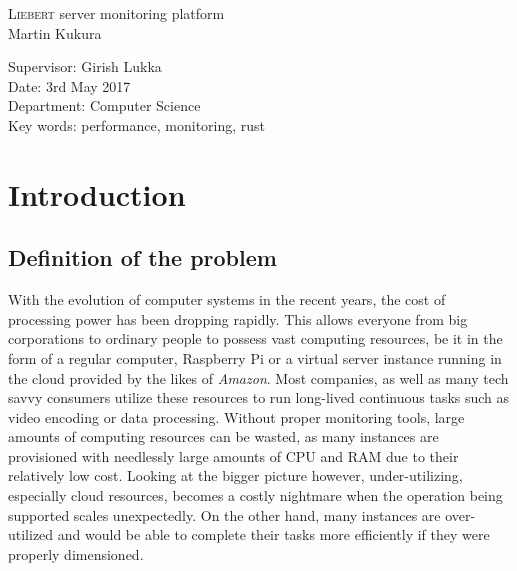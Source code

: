 \documentclass[12pt,a4paper,table]{article}
\begin{document}
    \begin{titlepage}
        \vspace*{1.5cm}
        \begin{center}
            \Huge{\textsc{Liebert} server monitoring platform}\\
            \Large{Martin Kukura}\\
        \end{center}
        \vspace*{\fill}
        \begin{center}
            \Large{Supervisor: Girish Lukka}\\
            \Large{Date: 3rd May 2017}\\
            \Large{Department: Computer Science}\\
            \Large{Key words: performance, monitoring, rust}\\
        \end{center}
        \vspace*{\fill}
    \end{titlepage}
    \pagebreak

    \tableofcontents
    \listoffigures

    \pagebreak


    \section{Introduction}
        \subsection{Definition of the problem}
            With the evolution of computer systems in the recent years, the cost of processing power has been dropping rapidly. This allows everyone from big corporations to ordinary people to possess vast computing resources, be it in the form of a regular computer, Raspberry Pi or a virtual server instance running in the cloud provided by the likes of \textit{Amazon}. Most companies, as well as many tech savvy consumers utilize these resources to run long-lived continuous tasks such as video encoding or data processing. Without proper monitoring tools, large amounts of computing resources can be wasted, as many instances are provisioned with needlessly large amounts of CPU and RAM due to their relatively low cost. Looking at the bigger picture however, under-utilizing, especially cloud resources, becomes a costly nightmare when the operation being supported scales unexpectedly. On the other hand, many instances are over-utilized and would be able to complete their tasks more efficiently if they were properly dimensioned.
\end{document}
